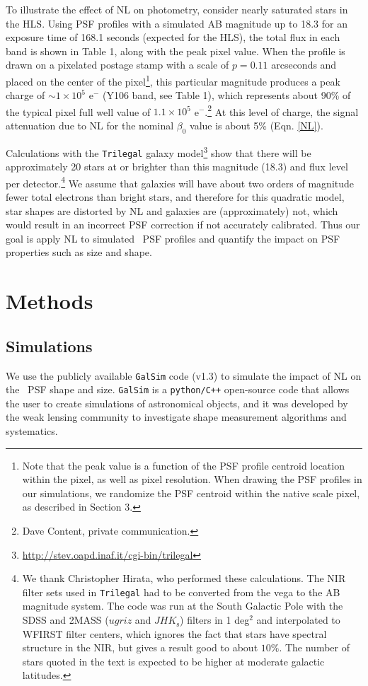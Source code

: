 \documentclass[11pt,preprint,flushrt]{aastex}
\begin{document}
To illustrate the effect of NL on photometry, consider nearly saturated stars in the HLS.  Using PSF profiles with a simulated AB magnitude up to 18.3 for an exposure time of 168.1 seconds (expected for the HLS), the total flux in each band is shown in Table 1, along with the peak pixel value. When the profile is drawn on a pixelated postage stamp with a scale of $p=0.11$ arcseconds and placed on the center of the pixel\footnote{Note that the peak value is a function of the PSF profile centroid location within the pixel, as well as pixel resolution. When drawing the PSF profiles in our simulations, we randomize the PSF centroid within the native scale pixel, as described in Section 3.}, this particular magnitude produces a peak charge of $\sim 1\times 10^5$ e$^{-}$ (Y106 band, see Table 1), which represents about 90\% of the typical pixel full well value of $1.1 \times 10^5$ e$^{-}$.\footnote{Dave Content, private communication.}
At this level of charge, the signal attenuation due to NL for the nominal $\beta_0$ value is about 5\% (Eqn. \ref{NL}). 

Calculations with the {\tt{Trilegal}} galaxy model\footnote{\url{http://stev.oapd.inaf.it/cgi-bin/trilegal}} \citep{girardi12} show that there will be approximately 20 stars at or brighter than this magnitude (18.3) and flux level per detector.\footnote{We thank Christopher Hirata, who performed these calculations. The NIR filter sets used in {\tt{Trilegal}} had to be converted from the vega to the AB magnitude system. The code was run at the South Galactic Pole with the SDSS and 2MASS ($ugriz$ and $JHK_\mathrm{s}$) filters in 1 deg$^2$ and interpolated to WFIRST filter centers, which ignores the fact that stars have spectral structure in the NIR, but gives a result good to about $10\%$. The number of stars quoted in the text is expected to be higher at moderate galactic latitudes.} We assume that galaxies will have about two orders of magnitude fewer total electrons than bright stars, and therefore for this quadratic model, star shapes are distorted by NL and galaxies are (approximately) not, which would result in an incorrect PSF correction if not accurately calibrated. Thus our goal is apply NL to simulated \wfa\ PSF profiles and quantify the impact on PSF properties such as size and shape. 

\section{Methods}
\label{methods}
\subsection {Simulations}
We use the publicly available {\tt{GalSim}} code (v1.3) to simulate the impact of NL on the \wfa\ PSF shape and size. {\tt{GalSim}} is a {\tt{python/C++}} open-source code that allows the user to create simulations of astronomical objects, and it was developed by the weak lensing community to investigate shape measurement algorithms and systematics. 
\end{document}
